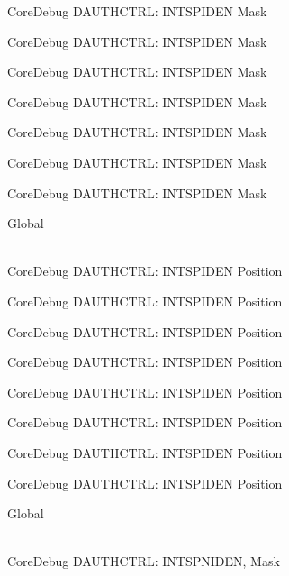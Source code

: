 \begin{DoxyRefList}
\label{deprecated__deprecated000144}%
%
Core\+Debug DAUTHCTRL\+: INTSPIDEN Mask 

\label{deprecated__deprecated000220}%
%
Core\+Debug DAUTHCTRL\+: INTSPIDEN Mask 

\label{deprecated__deprecated000283}%
%
Core\+Debug DAUTHCTRL\+: INTSPIDEN Mask 

\label{deprecated__deprecated000362}%
%
Core\+Debug DAUTHCTRL\+: INTSPIDEN Mask 

\label{deprecated__deprecated000438}%
%
Core\+Debug DAUTHCTRL\+: INTSPIDEN Mask 

\label{deprecated__deprecated000541}%
%
Core\+Debug DAUTHCTRL\+: INTSPIDEN Mask 

\label{deprecated__deprecated000643}%
%
Core\+Debug DAUTHCTRL\+: INTSPIDEN Mask  
\item[{\parbox[t]{\linewidth}{Global \doxylink{group___c_m_s_i_s___s_c_b_ga3caef9790e4e2ccbfea77d55315ad59f}{Core\+Debug\+\_\+\+DAUTHCTRL\+\_\+\+INTSPIDEN\+\_\+\+Pos} }}]\hfill \\
\label{deprecated__deprecated000089}%
%
Core\+Debug DAUTHCTRL\+: INTSPIDEN Position 

\label{deprecated__deprecated000143}%
%
Core\+Debug DAUTHCTRL\+: INTSPIDEN Position 

\label{deprecated__deprecated000219}%
%
Core\+Debug DAUTHCTRL\+: INTSPIDEN Position 

\label{deprecated__deprecated000282}%
%
Core\+Debug DAUTHCTRL\+: INTSPIDEN Position 

\label{deprecated__deprecated000361}%
%
Core\+Debug DAUTHCTRL\+: INTSPIDEN Position 

\label{deprecated__deprecated000437}%
%
Core\+Debug DAUTHCTRL\+: INTSPIDEN Position 

\label{deprecated__deprecated000540}%
%
Core\+Debug DAUTHCTRL\+: INTSPIDEN Position 

\label{deprecated__deprecated000642}%
%
Core\+Debug DAUTHCTRL\+: INTSPIDEN Position  
\item[{\parbox[t]{\linewidth}{Global \doxylink{group___c_m_s_i_s___s_c_b_gadad0bf68d32cba49c1ea7534122c2752}{Core\+Debug\+\_\+\+DAUTHCTRL\+\_\+\+INTSPNIDEN\+\_\+\+Msk} }}]\hfill \\
\label{deprecated__deprecated000086}%
%
Core\+Debug DAUTHCTRL\+: INTSPNIDEN, Mask 


\end{DoxyRefList}
